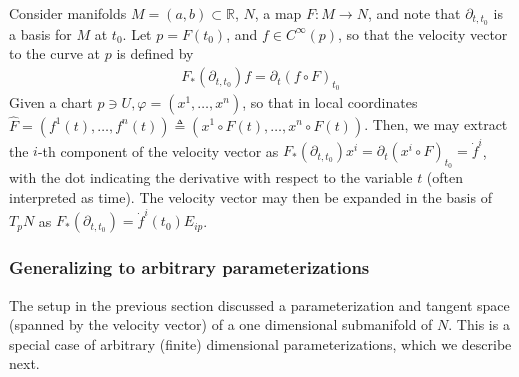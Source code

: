 \documentclass[psamsfonts]{amsart}
\theoremstyle{definition}
\theoremstyle{remark}
\newcommand*\R{\mathds{R}}
\numberwithin{equation}{section}
\begin{document}
Consider manifolds $M = (a,b)\subset \R$, $N$, a map $F:M\rightarrow N$, and note that $\partial_{t,t_0}$ is a basis for $M$ at $t_0$. Let $p=F(t_0)$, and $f\in C^{\infty}(p)$, so that the {velocity vector} to the curve at $p$ is defined by 
\begin{align}\label{eq:velocityvec}
F_*\left(\partial_{t,t_0}\right)f = \partial_t\left(f\circ F\right)_{t_0}
\end{align}
Given a chart $p \ni U, \varphi = (x^1, \dots, x^n)$, so that in local coordinates $\hat F = (f^1(t), \dots, f^n(t)) \triangleq (x^1\circ F(t), \dots, x^n \circ F(t))$. 
Then, we may extract the $i$-th component of the velocity vector as $F_*(\partial_{t, t_0}) x^i ={} \partial_{t}(x^i \circ F)_{t_0} = \dot{f}^i$,
with the dot indicating the derivative with respect to the variable $t$ (often interpreted as time). The velocity vector may then be expanded in the basis of $T_pN$ as $F_*(\partial_{t, t_0}) = \dot f^i(t_0)E_{ip}$. 

\subsubsection{Generalizing to arbitrary parameterizations} The setup in the previous section discussed a parameterization and tangent space (spanned by the velocity vector) of a one dimensional submanifold of $N$. 
This is a special case of arbitrary (finite) dimensional parameterizations, which we describe next. 
\end{document}
